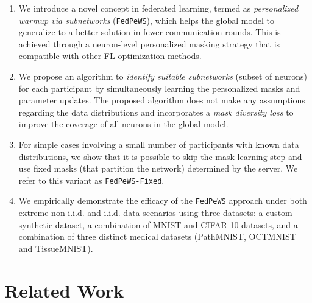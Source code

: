 \documentclass{article}
\begin{document}
\begin{enumerate}
    \item We introduce a novel concept in federated learning, termed as \textit{personalized warmup via subnetworks} (\texttt{FedPeWS}), which helps the global model to generalize to a better solution in fewer communication rounds. This is achieved through a neuron-level personalized masking strategy that is compatible with other FL optimization methods. 
    \item We propose an algorithm to \textit{identify suitable subnetworks} (subset of neurons) for each participant by simultaneously learning the personalized masks and parameter updates. The proposed algorithm does not make any assumptions regarding the data distributions and incorporates a \textit{mask diversity loss} to improve the coverage of all neurons in the global model. 
    \item For simple cases involving a small number of participants with known data distributions, we show that it is possible to skip the mask learning step and use fixed masks (that partition the network) determined by the server. We refer to this variant as \texttt{FedPeWS-Fixed}. 
    \item We empirically demonstrate the efficacy of the \texttt{FedPeWS} approach under both extreme non-i.i.d. and i.i.d. data scenarios using three datasets: a custom synthetic dataset, a combination of MNIST and CIFAR-10 datasets, and a combination of three distinct medical datasets (PathMNIST, OCTMNIST and TissueMNIST). 
\end{enumerate} 

\section{Related Work} 
\end{document}

